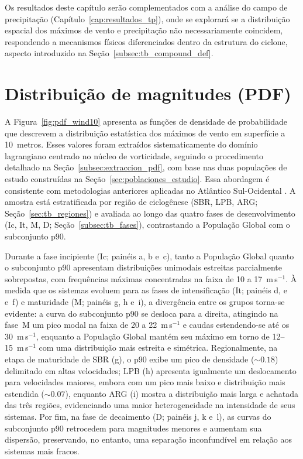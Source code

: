 Os resultados deste capítulo serão complementados com a análise do campo de precipitação (Capítulo~\ref{cap:resultados_tp}), onde se explorará se a distribuição espacial dos máximos de vento e precipitação não necessariamente coincidem, respondendo a mecanismos físicos diferenciados dentro da estrutura do ciclone, aspecto introduzido na Seção~\ref{subsec:tb_compound_def}.


\section{Distribuição de magnitudes (PDF)}\label{sec:pdf_wind10}

A Figura~\ref{fig:pdf_wind10} apresenta as funções de densidade de probabilidade que descrevem a distribuição estatística dos máximos de vento em superfície a 10~metros. Esses valores foram extraídos sistematicamente do domínio lagrangiano centrado no núcleo de vorticidade, seguindo o procedimento detalhado na Seção~\ref{subsec:extraccion_pdf}, com base nas duas populações de estudo construídas na Seção~\ref{sec:poblaciones_estudio}. Essa abordagem é consistente com metodologias anteriores aplicadas no Atlântico Sul-Ocidental \citep{cardoso2022synoptic}. A amostra está estratificada por região de ciclogênese (SBR, LPB, ARG; Seção~\ref{sec:tb_regiones}) e avaliada ao longo das quatro fases de desenvolvimento (Ic, It, M, D; Seção~\ref{subsec:tb_fases}), contrastando a População Global com o subconjunto p90.

Durante a fase incipiente (Ic; painéis a, b e~c), tanto a População Global quanto o subconjunto p90 apresentam distribuições unimodais estreitas parcialmente sobrepostas, com frequências máximas concentradas na faixa de 10 a 17~m\,s$^{-1}$. À medida que os sistemas evoluem para as fases de intensificação (It; painéis d, e e~f) e maturidade (M; painéis g, h e~i), a divergência entre os grupos torna-se evidente: a curva do subconjunto p90 se desloca para a direita, atingindo na fase~M um pico modal na faixa de 20 a 22~m\,s$^{-1}$ e caudas estendendo-se até os 30~m\,s$^{-1}$, enquanto a População Global mantém seu máximo em torno de 12--15~m\,s$^{-1}$ com uma distribuição mais estreita e simétrica. Regionalmente, na etapa de maturidade de SBR (g), o p90 exibe um pico de densidade (${\sim}0.18$) delimitado em altas velocidades; LPB (h) apresenta igualmente um deslocamento para velocidades maiores, embora com um pico mais baixo e distribuição mais estendida (${\sim}0.07$), enquanto ARG (i) mostra a distribuição mais larga e achatada das três regiões, evidenciando uma maior heterogeneidade na intensidade de seus sistemas. Por fim, na fase de decaimento (D; painéis j, k e~l), as curvas do subconjunto p90 retrocedem para magnitudes menores e aumentam sua dispersão, preservando, no entanto, uma separação inconfundível em relação aos sistemas mais fracos.


